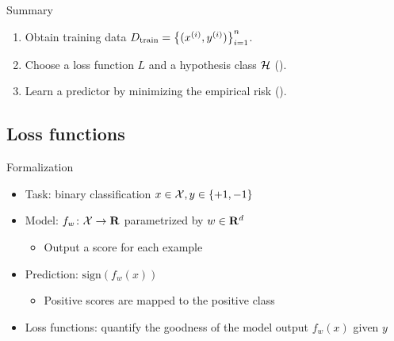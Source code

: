 \documentclass[usenames,dvipsnames,notes,11pt,aspectratio=169]{beamer}
\begin{document}
\begin{frame}
    {Summary}
    \begin{enumerate}
        \itemsep2em
        \item Obtain training data $D_{\text{train}}=\left\{ (x^{(i)}, y^{(i)}) \right\}_{i=1}^n$.
        \item Choose a loss function $L$ and a hypothesis class $\mathcal{H}$ ().
        \item Learn a predictor by minimizing the empirical risk ().
    \end{enumerate}
\end{frame}

\subsection{Loss functions}

\begin{frame}
    {Formalization}
    \begin{itemize}
        \itemsep1em
        \item Task: binary classification $x\in\mathcal{X}, y\in\left\{ +1, -1 \right\}$
        \item Model: $f_w\colon \mathcal{X} \rightarrow \mathbf{R}$ parametrized by $w \in \mathbf{R}^d$
            \begin{itemize}
                \item Output a score for each example
            \end{itemize}
        \item Prediction: $\text{sign}(f_w(x))$
            \begin{itemize}
                \item Positive scores are mapped to the positive class 
            \end{itemize}
        \item Loss functions: quantify the goodness of the model output $f_w(x)$ given $y$
    \end{itemize}
\end{frame}
\end{document}

